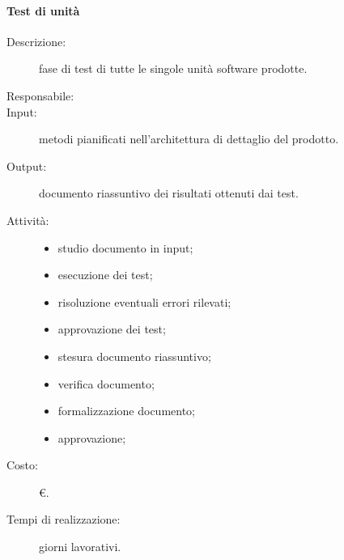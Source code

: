 \paragraph{Test di unità}
\begin{description}
\item[Descrizione:] fase di test di tutte le singole unità software prodotte.
\item[Responsabile:] 
\item[Input:] metodi pianificati nell'architettura di dettaglio del prodotto.
\item[Output:] documento riassuntivo dei risultati ottenuti dai test.
\item[Attività:]
\begin{itemize}
\item studio documento in input;
\item esecuzione dei test;
\item risoluzione eventuali errori rilevati;
\item approvazione dei test;
\item stesura documento riassuntivo;
\item verifica documento;
\item formalizzazione documento;
\item approvazione;
\end{itemize}
\item[Costo:] \euro{}.
\item[Tempi di realizzazione:]  giorni lavorativi.
\end{description}

